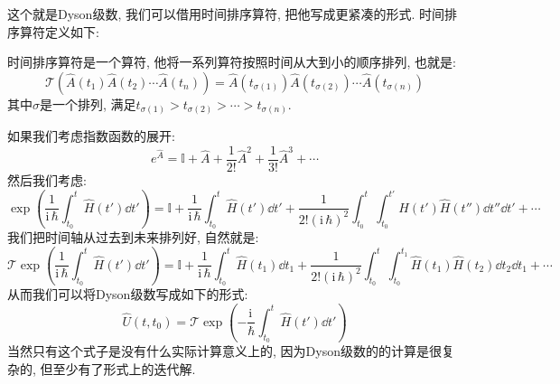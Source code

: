 这个就是Dyson级数, 我们可以借用时间排序算符, 把他写成更紧凑的形式.
时间排序算符定义如下:
\begin{definition}[][时间排序算符]
  时间排序算符是一个算符, 他将一系列算符按照时间从大到小的顺序排列, 也就是:
  \begin{equation}
    \mathcal{T} \left( \hat{A}(t_1) \hat{A}(t_2) \cdots \hat{A}(t_n) \right) = \hat{A}(t_{\sigma(1)}) \hat{A}(t_{\sigma(2)}) \cdots \hat{A}(t_{\sigma(n)})
  \end{equation}
  其中$\sigma$是一个排列, 满足$t_{\sigma(1)} > t_{\sigma(2)} > \cdots > t_{\sigma(n)}$.
\end{definition}
如果我们考虑指数函数的展开:
\begin{equation}
  e^{\hat{A}} = \mathbb{I} + \hat{A} + \frac{1}{2!} \hat{A}^2 + \frac{1}{3!} \hat{A}^3 + \cdots
\end{equation}
然后我们考虑:
\begin{equation}
  \exp(\frac{1}{\mathrm{i}\,\hbar} \int_{t_0}^{t} \hat{H}(t') \dd{t'}) = \mathbb{I} + \frac{1}{\mathrm{i}\,\hbar} \int_{t_0}^{t} \hat{H}(t') \dd{t'} + \frac{1}{2! (\mathrm{i}\,\hbar)^2} \int_{t_0}^{t} \int_{t_0}^{t'} \hat{H}(t') \hat{H}(t'') \dd{t''} \dd{t'} + \cdots
\end{equation}
我们把时间轴从过去到未来排列好, 自然就是:
\begin{equation}
  \mathcal{T} \exp(\frac{1}{\mathrm{i}\,\hbar} \int_{t_0}^{t} \hat{H}(t') \dd{t'}) = \mathbb{I} + \frac{1}{\mathrm{i}\,\hbar} \int_{t_0}^{t} \hat{H}(t_1) \dd{t_1} + \frac{1}{2! (\mathrm{i}\,\hbar)^2} \int_{t_0}^{t} \int_{t_0}^{t_1} \hat{H}(t_1) \hat{H}(t_2) \dd{t_2} \dd{t_1} + \cdots
\end{equation}
从而我们可以将Dyson级数写成如下的形式:
\begin{equation}
  \hat{U}(t,t_0) = \mathcal{T} \exp\left( -\frac{\mathrm{i}\,}{\hbar} \int_{t_0}^{t} \hat{H}(t') \dd{t'} \right)
\end{equation}
当然只有这个式子是没有什么实际计算意义上的, 因为Dyson级数的的计算是很复杂的, 但至少有了形式上的迭代解.


